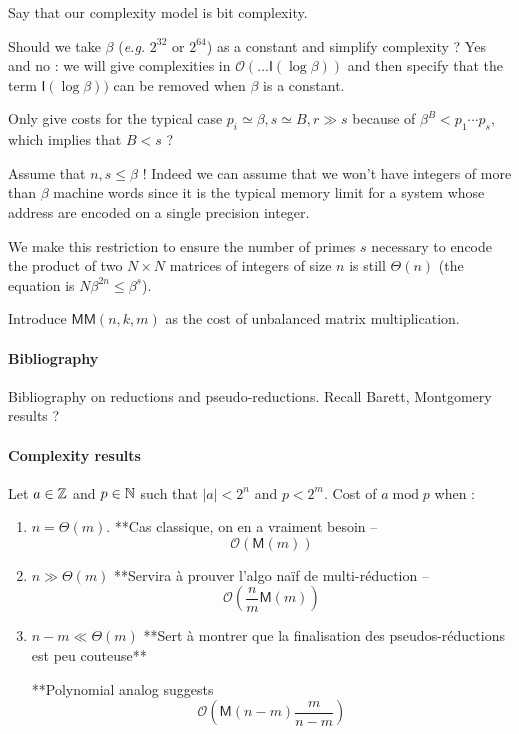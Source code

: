 \documentclass[acmtoms,acmnow]{acmtrans2m}
\def\M{\mathsf{M}} \def\I{\mathsf{I}} \def\R{\mathsf{R}} \def\Q{\mathbb{Q}}
\def\bigO{{\ensuremath{\mathcal{O}}}}
\newcommand{\tmop}[1]{\ensuremath{\operatorname{#1}}}
\begin{document}
Say that our complexity model is bit complexity.

Should we take $\beta$ (\emph{e.g.} $2^{32}$ or $2^{64}$) as a constant and simplify complexity ?
Yes and no : we will give complexities in
$\bigO( \dots\I(\log \beta) )$ and then specify that the term $\I(\log \beta))$
can be removed when $\beta$ is a constant.

Only give costs for the typical case $p_i \simeq \beta, s \simeq B, r
\gg s$ because of $\beta^B < p_1 \cdots p_s$, which implies that $B < s$ ?

Assume that $n,s \leqslant \beta$ !  Indeed we can assume that
we won't have integers of more than $\beta$ machine words since it
is the typical memory limit for a system whose address are encoded
on a single precision integer. 

We make this restriction to ensure the number of primes $s$
necessary to encode the product of two $N \times N$ matrices of
integers of size $n$ is still $\Theta(n)$ (the equation is
$N \beta^{2n} \leqslant \beta^s$).

Introduce $\M\M(n,k,m)$ as the cost of unbalanced matrix multiplication.

\paragraph{Bibliography} Bibliography on reductions and pseudo-reductions.
Recall Barett, Montgomery results ?

\paragraph{Complexity results}

Let $a \in\mathbb{Z}$ and $p \in \mathbb{N}$ such that $|a|<2^n$ and $p<2^m$.
Cost of $a \tmop{mod} p$ when :

\begin{enumerate}
  \item $n = \Theta (m)$. **Cas classique, on en a vraiment besoin
    -- 
    \begin{equation}\label{eq:complexityReduction1} 
      \bigO \left( \M (m) \right)
    \end{equation}
  
  \item $n \gg \Theta (m)$ **Servira {\`a} prouver l'algo na{\"i}f
    de multi-r{\'e}duction -- 
    \begin{equation}\label{eq:complexityReduction2} 
      \bigO \left( \frac{n}{m} \M(m) \right)
    \end{equation}
  
  \item $n-m \ll \Theta (m)$ **Sert {\`a} montrer que la
    finalisation des pseudos-r{\'e}ductions est peu couteuse**
  
  **Polynomial analog suggests 
\begin{equation}\label{eq:complexityReduction3} 
\bigO \left( \M (n-m) \frac{m}{n-m}
  \right)
\end{equation}

\end{enumerate}
\end{document}

